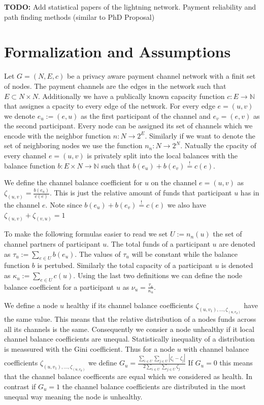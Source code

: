 \documentclass[a4paper]{paper}
\begin{document}
\textbf{TODO:} Add statistical papers of the lightning network. Payment reliability and path finding methods (similar to PhD Proposal)


\section{Formalization and Assumptions}\label{sec:formalization}
Let $G=(N,E,c)$ be a privacy aware payment channel network with a finit set of nodes.
The payment channels are the edges in the network such that $E\subset N\times N$.
Additionally we have a publically known capacity function $c: E\longrightarrow \mathbb{N}$ that assignes a cpacity to every edge of the network.
For every edge $e=(u,v)$ we denote $e_u:=(e,u)$ as the first participant of the channel and $e_v=(e,v)$ as the second participant.
Every node can be assigned its set of channels which we encode with the neighbor function $n : N \longrightarrow 2^{E}$.
Similarly if we want to denote the set of neighboring nodes we use the function $n_n : N \longrightarrow 2^{N}$.
Natually the cpacity of every channel $e=(u,v)$ is privately split into the local balances with the balance function $b: E\times N\longrightarrow\mathbb{N}$ such that $b(e_u)+b(e_v)\stackrel{!}{=}c(e)$.

We define the channel balance coefficient for $u$ on the channel $e=(u,v)$ as  $\zeta_{(u,v)} = \frac{b(e_u)}{c(e)}$.
This is just the relative amount of funds that participant $u$ has in the channel $e$.
Note since $b(e_u)+b(e_v)\stackrel{!}{=}c(e)$ we also have $\zeta_{(u,v)} + \zeta_{(v,u)}=1$

To make the following formulas easier to read we set $U:=n_n(u)$ the set of channel partners of participant $u$.
The total funds of a participant $u$ are denoted as $\tau_u:=\displaystyle{\sum_{e\in U}b(e_u)}$.
The values of $\tau_u$ will be constant while the balance function $b$ is pertubed.
Similarly the total capacity of a participant $u$ is denoted as $\kappa_u:=\displaystyle{\sum_{e\in U}c(u)}$.
Using the last two definitions we can define the node balance coefficient for a participant $u$ as $\nu_u = \frac{\tau_u}{\kappa_u}$.

We define a node $u$ healthy if its channel balance coefficients $\zeta_{(u,v_1),\dots,\zeta_{(u,v_d)}}$ have the same value.
This means that the relative distribution of a nodes funds across all its channels is the same.
Consequently we consier a node unhealthy if it local channel balance coefficients are unequal.
Statistically inequality of a distribution is meassured with the Gini coefficient.
Thus for a node $u$ with channel balance coefficients $\zeta_{(u,v_1),\dots,\zeta_{(u,v_d)}}$ we define $G_u = \frac{\displaystyle{\sum_{i\in U} \sum_{j \in U}} | \zeta_i - \zeta_j |}{2 \displaystyle{\sum_{i \in U} \sum_{j \in U} \zeta_j}}$
If $G_u = 0$ this means that the channel balance coefficents are equal which we considered as health.
In contrast if $G_u = 1$ the channel balance coefficients are distributed in the most unequal way meaning the node is unhealthy.
\end{document}
